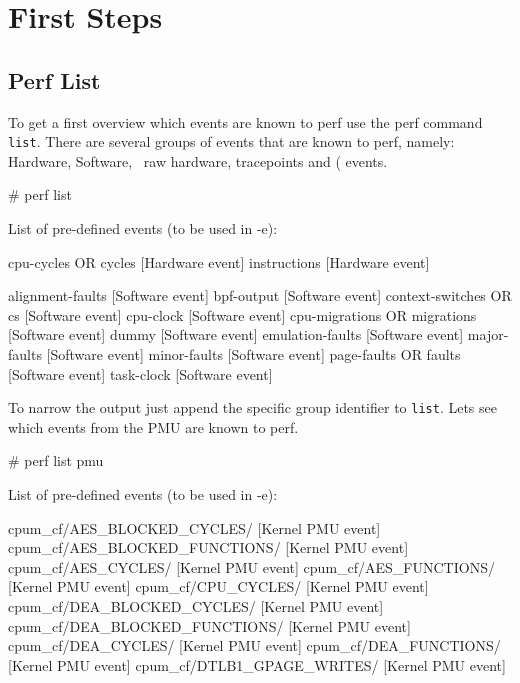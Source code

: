 \chapter{First Steps}
\section{Perf List}

To get a first overview which events are known to perf use the perf
command {\tt list}. There are several groups of events that are known to
perf, namely: Hardware, Software, \PMU\, raw hardware,
tracepoints and  (\SDT\) events.

\starttyping
# perf list

List of pre-defined events (to be used in -e):

  cpu-cycles OR cycles                               [Hardware event]
  instructions                                       [Hardware event]

  alignment-faults                                   [Software event]
  bpf-output                                         [Software event]
  context-switches OR cs                             [Software event]
  cpu-clock                                          [Software event]
  cpu-migrations OR migrations                       [Software event]
  dummy                                              [Software event]
  emulation-faults                                   [Software event]
  major-faults                                       [Software event]
  minor-faults                                       [Software event]
  page-faults OR faults                              [Software event]
  task-clock                                         [Software event]
\stoptyping

To narrow the output just append the specific group identifier to
{\tt list}. Lets see which events from the PMU are known to perf.

\starttyping
# perf list pmu

List of pre-defined events (to be used in -e):

  cpum_cf/AES_BLOCKED_CYCLES/                        [Kernel PMU event]
  cpum_cf/AES_BLOCKED_FUNCTIONS/                     [Kernel PMU event]
  cpum_cf/AES_CYCLES/                                [Kernel PMU event]
  cpum_cf/AES_FUNCTIONS/                             [Kernel PMU event]
  cpum_cf/CPU_CYCLES/                                [Kernel PMU event]
  cpum_cf/DEA_BLOCKED_CYCLES/                        [Kernel PMU event]
  cpum_cf/DEA_BLOCKED_FUNCTIONS/                     [Kernel PMU event]
  cpum_cf/DEA_CYCLES/                                [Kernel PMU event]
  cpum_cf/DEA_FUNCTIONS/                             [Kernel PMU event]
  cpum_cf/DTLB1_GPAGE_WRITES/                        [Kernel PMU event]
\stoptyping

